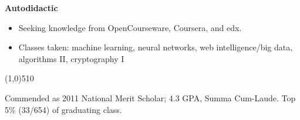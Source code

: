 \documentclass{report}
\newcommand{\cut}{\begin{center} \line(1,0){510} \end{center}}
\begin{document}
\textbf{Autodidactic}
\begin{itemize}
  \renewcommand{\labelitemi}{$\circ$}
\item Seeking knowledge from OpenCourseware, Coursera, and edx.
\item Classes taken: machine learning, neural networks, web intelligence/big data, algorithms II, cryptography I
\end{itemize}

\cut{}

Commended as 2011 National Merit Scholar; 4.3 GPA, Summa Cum-Laude. Top 5\% (33/654) of graduating class.
\end{document}
